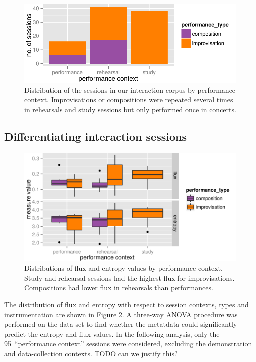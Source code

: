 \documentclass{sigchi}
\begin{document}
\begin{figure}
  \centering
  \includegraphics[width=\linewidth]{figures/sessions-count}
  \caption{Distribution of the sessions in our interaction corpus by
    performance context. Improvisations or compositions were repeated
    several times in rehearsals and study sessions but only performed
    once in concerts.
    \label{fig:count-data}}
\end{figure}


\subsection{Differentiating interaction sessions}
\label{differentiating-interaction-sessions}

\begin{figure} \centering
  \includegraphics[width=\linewidth]{figures/context-flux-entropy-boxplot}
  \caption{Distributions of flux and entropy values by performance
context. Study and rehearsal sessions had the highest flux for
improvisations. Compositions had lower
flux in rehearsals than performances.
\label{fig:flux-entropy-boxplot}}
\end{figure}

The distribution of flux and entropy with respect to session contexts,
types and instrumentation are shown in Figure
\ref{fig:flux-entropy-boxplot}. A three-way ANOVA procedure was
performed on the data set to find whether the metatdata could
significantly predict the entropy and flux values.
In the following analysis, only the 95~``performance context''
sessions were considered, excluding the demonstration and
data-collection contexts. TODO can we justify this?
\end{document}

